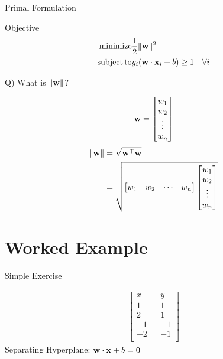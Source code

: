 \documentclass{beamer}
\begin{document}
\begin{frame}{Primal Formulation}
	\begin{tcolorbox}{Objective}
	\begin{align*}
	\operatorname{minimize} & \frac{1}{2}\|\mathbf{w}\|^{2} \\
	\operatorname{subject\,to} & y_{i}(\mathbf{w} \cdot \mathbf{x}_{i} + b) \geq 1 \quad \forall i
	\end{align*}
\end{tcolorbox}
\pause 
Q) What is $\|\mathbf{w}\|$?
\pause
\begin{multicols}{2}
\begin{equation*}
	 \mathbf{w} = \begin{bmatrix}
	 w_{1} \\
     w_{2} \\
     \vdots  \\
     w_{n} \\
	\end{bmatrix}
\end{equation*}\break
\begin{align*}
	 \|\mathbf{w}\| &= \sqrt{\mathbf{w}^\top\mathbf{w}}\\
	 &= \sqrt{\begin{bmatrix}
	 w_{1} & w_{2} & \cdots & w_{n}
	 \end{bmatrix}
	 \begin{bmatrix}
	  w_{1} \\
	  w_{2} \\
     \vdots  \\
     w_{n} \\
	 \end{bmatrix}}
\end{align*}

\end{multicols}

\end{frame}

\section{Worked Example}

{
	
}

\begin{frame}{Simple Exercise}

\begin{align*}
\begin{bmatrix}
x && y \\
1 && 1\\
2 && 1\\
-1 && -1\\
-2 && -1\\
\end{bmatrix}
\end{align*}
Separating Hyperplane: $\mathbf{w} \cdot \mathbf{x} + b = 0$
\end{frame}
\end{document}
